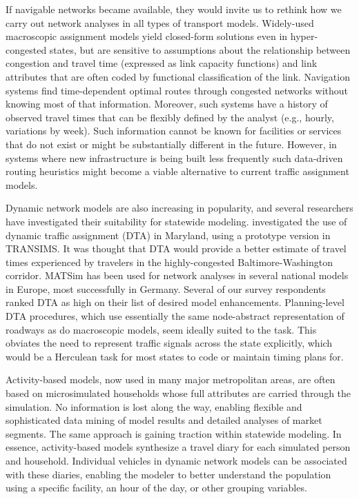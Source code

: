 If navigable networks became available, they would invite us to rethink how we carry out network analyses in all types of transport models. Widely-used macroscopic assignment models yield closed-form solutions even in hyper-congested states, but are sensitive to assumptions about the relationship between congestion and travel time (expressed as link capacity functions) and link attributes that are often coded by functional classification of the link. Navigation systems find time-dependent optimal routes through congested networks without knowing most of that information. Moreover, such systems have a history of observed travel times that can be flexibly defined by the analyst (e.g., hourly, variations by week). Such information cannot be known for facilities or services that do not exist or might be substantially different in the future. However, in systems where new infrastructure is being built less frequently such data-driven routing heuristics might become a viable alternative to current traffic assignment models.

Dynamic network models are also increasing in popularity, and several researchers have investigated their suitability for statewide modeling. \cite{erdogan14} investigated the use of dynamic traffic assignment (DTA) in Maryland, using a prototype version in TRANSIMS. It was thought that DTA would provide a better estimate of travel times experienced by travelers in the highly-congested Baltimore-Washington corridor. MATSim has been used for network analyses in several national models in Europe, most successfully in Germany. Several of our survey respondents ranked DTA as high on their list of desired model enhancements. Planning-level DTA procedures, which use essentially the same node-abstract representation of roadways as do macroscopic models, seem ideally suited to the task. This obviates the need to represent traffic signals across the state explicitly, which would be a Herculean task for most states to code or maintain timing plans for.

Activity-based models, now used in many major metropolitan areas, are often based on microsimulated households whose full attributes are carried through the simulation. No information is lost along the way, enabling flexible and sophisticated data mining of model results and detailed analyses of market segments. The same approach is gaining traction within statewide modeling. In essence, activity-based models synthesize a travel diary for each simulated person and household. Individual vehicles in dynamic network models can be associated with these diaries, enabling the modeler to better understand the population using a specific facility, an hour of the day, or other grouping variables.

